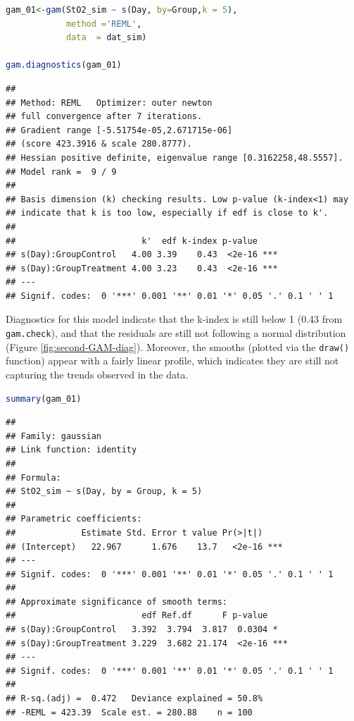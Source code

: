 \documentclass[
]{article}
\newcommand{\passthrough}[1]{#1}
\begin{document}
\begin{lstlisting}[language=R]
gam_01<-gam(StO2_sim ~ s(Day, by=Group,k = 5),
            method ='REML',
            data  = dat_sim)

gam.diagnostics(gam_01)
\end{lstlisting}

\begin{lstlisting}
## 
## Method: REML   Optimizer: outer newton
## full convergence after 7 iterations.
## Gradient range [-5.51754e-05,2.671715e-06]
## (score 423.3916 & scale 280.8777).
## Hessian positive definite, eigenvalue range [0.3162258,48.5557].
## Model rank =  9 / 9 
## 
## Basis dimension (k) checking results. Low p-value (k-index<1) may
## indicate that k is too low, especially if edf is close to k'.
## 
##                         k'  edf k-index p-value    
## s(Day):GroupControl   4.00 3.39    0.43  <2e-16 ***
## s(Day):GroupTreatment 4.00 3.23    0.43  <2e-16 ***
## ---
## Signif. codes:  0 '***' 0.001 '**' 0.01 '*' 0.05 '.' 0.1 ' ' 1
\end{lstlisting}

Diagnostics for this model indicate that the k-index is still below 1 (0.43 from \passthrough{\lstinline!gam.check!}), and that the residuals are still not following a normal distribution (Figure \ref{fig:second-GAM-diag}). Moreover, the smooths (plotted via the \passthrough{\lstinline!draw()!} function) appear with a fairly linear profile, which indicates they are still not capturing the trends observed in the data.

\begin{lstlisting}[language=R]
summary(gam_01)
\end{lstlisting}

\begin{lstlisting}
## 
## Family: gaussian 
## Link function: identity 
## 
## Formula:
## StO2_sim ~ s(Day, by = Group, k = 5)
## 
## Parametric coefficients:
##             Estimate Std. Error t value Pr(>|t|)    
## (Intercept)   22.967      1.676    13.7   <2e-16 ***
## ---
## Signif. codes:  0 '***' 0.001 '**' 0.01 '*' 0.05 '.' 0.1 ' ' 1
## 
## Approximate significance of smooth terms:
##                         edf Ref.df      F p-value    
## s(Day):GroupControl   3.392  3.794  3.817  0.0304 *  
## s(Day):GroupTreatment 3.229  3.682 21.174  <2e-16 ***
## ---
## Signif. codes:  0 '***' 0.001 '**' 0.01 '*' 0.05 '.' 0.1 ' ' 1
## 
## R-sq.(adj) =  0.472   Deviance explained = 50.8%
## -REML = 423.39  Scale est. = 280.88    n = 100
\end{lstlisting}
\end{document}
